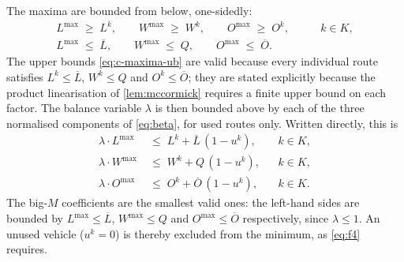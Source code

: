 \documentclass[11pt,a4paper]{article}
\theoremstyle{definition}
\theoremstyle{plain}
\newcommand{\Veh}{K}
\newcommand{\Lmax}{L^{\max}}
\newcommand{\Wmax}{W^{\max}}
\newcommand{\Omax}{O^{\max}}
\newcommand{\Lub}{\overline{L}}
\newcommand{\Oub}{\overline{O}}
\begin{document}
The maxima are bounded from below, one-sidedly:
\begin{align}
  \Lmax \;\ge\; L^k, \qquad
  \Wmax \;\ge\; W^k, \qquad
  \Omax \;\ge\; O^k,
  \qquad & k \in \Veh, \label{eq:c-maxima}\\
  \Lmax \;\le\; \Lub, \qquad
  \Wmax \;\le\; Q, \qquad
  \Omax \;\le\; \Oub. &  \label{eq:c-maxima-ub}
\end{align}
The upper bounds \eqref{eq:c-maxima-ub} are valid because every individual
route satisfies $L^k \le \Lub$, $W^k \le Q$ and $O^k \le \Oub$; they are stated
explicitly because the product linearisation of \cref{lem:mccormick} requires a
finite upper bound on each factor.
The balance variable $\lambda$ is then bounded above by each of the three
normalised components of \eqref{eq:beta}, for used routes only.  Written
directly, this is
\begin{align}
  \lambda \cdot \Lmax &\;\le\; L^k + \Lub\,(1-u^k), & &k \in \Veh,
  \label{eq:c-balL}\\
  \lambda \cdot \Wmax &\;\le\; W^k + Q\,(1-u^k), & &k \in \Veh,
  \label{eq:c-balW}\\
  \lambda \cdot \Omax &\;\le\; O^k + \Oub\,(1-u^k), & &k \in \Veh.
  \label{eq:c-balO}
\end{align}
The big-$M$ coefficients are the smallest valid ones: the left-hand sides are
bounded by $\Lmax \le \Lub$, $\Wmax \le Q$ and $\Omax \le \Oub$ respectively,
since $\lambda \le 1$.  An unused vehicle ($u^k = 0$) is thereby excluded from
the minimum, as \cref{eq:f4} requires.
\end{document}
